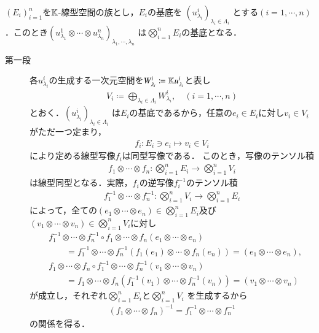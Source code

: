 	\begin{screen}
		\begin{thm}[テンソル積の基底]
			$(E_i)_{i=1}^n$を$\mathbb{K}$-線型空間の族とし，$E_i$の基底を
			$\left( u^i_{\lambda_i} \right)_{\lambda_i \in \Lambda_i}$
			とする$(i=1,\cdots,n)$．このとき$\left( u^1_{\lambda_1} \otimes 
			\cdots \otimes u^n_{\lambda_n} \right)_{\lambda_1,\cdots,\lambda_n}$
			は$\bigotimes_{i=1}^n E_i$の基底となる．
		\end{thm}
	\end{screen}
	
	\begin{prf}\mbox{}
		\begin{description}
			\item[第一段]
				各$u^i_{\lambda_i}$の生成する一次元空間を$W^i_{\lambda_i} \coloneqq \mathbb{K} u^i_{\lambda_i}$と表し
				\begin{align}
					V_i \coloneqq \bigoplus_{\lambda_i \in \Lambda_i} W^i_{\lambda_i},
					\quad (i=1,\cdots,n)
				\end{align}
				とおく．$\left( u^i_{\lambda_i} \right)_{\lambda_i \in \Lambda_i}$
				は$E_i$の基底であるから，任意の$e_i \in E_i$に対し$v_i \in V_i$がただ一つ定まり，
				\begin{align}
					f_i:E_i \ni e_i \longmapsto v_i \in V_i
				\end{align}
				により定める線型写像$f_i$は同型写像である．
				このとき，写像のテンソル積
				\begin{align}
					f_1 \otimes \cdots \otimes f_n:
					\bigotimes_{i=1}^n E_i \longrightarrow \bigotimes_{i=1}^n V_i
				\end{align}
				は線型同型となる．実際，$f_i$の逆写像$f^{-1}_i$のテンソル積
				\begin{align}
					f^{-1}_1 \otimes \cdots \otimes f^{-1}_n:
					\bigotimes_{i=1}^n V_i \longrightarrow \bigotimes_{i=1}^n E_i
				\end{align}
				によって，全ての$(e_1 \otimes\cdots\otimes e_n) \in \bigotimes_{i=1}^n E_i$及び
				$(v_1 \otimes\cdots\otimes v_n) \in \bigotimes_{i=1}^n V_i$に対し
				\begin{align}
					&f^{-1}_1 \otimes \cdots \otimes f^{-1}_n \circ 
						f_1 \otimes \cdots \otimes f_n
						(e_1 \otimes \cdots \otimes e_n) \\
					&\qquad = f^{-1}_1 \otimes \cdots \otimes f^{-1}_n
						\left( f_1(e_1) \otimes \cdots \otimes f_n(e_n) \right)
						= (e_1 \otimes \cdots \otimes e_n), \\
					&f_1 \otimes \cdots \otimes f_n \circ 
						f^{-1}_1 \otimes \cdots \otimes f^{-1}_n
						(v_1 \otimes \cdots \otimes v_n) \\
					&\qquad = f_1 \otimes \cdots \otimes f_n
						\left( f^{-1}_1(v_1) \otimes \cdots \otimes f^{-1}_n(v_n) \right)
						= (v_1 \otimes \cdots \otimes v_n)
				\end{align}
				が成立し，それぞれ$\bigotimes_{i=1}^n E_i$と$\bigotimes_{i=1}^n V_i$
				を生成するから
				\begin{align}
					(f_1 \otimes \cdots \otimes f_n)^{-1}
					= f^{-1}_1 \otimes \cdots \otimes f^{-1}_n
				\end{align}
				の関係を得る．
				

\end{description}
\end{prf}
